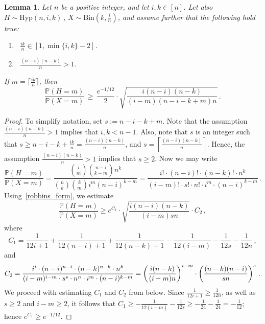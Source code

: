 \documentclass[10pt]{article}
\theoremstyle{plain}
\newtheorem{lemma}[theorem]{Lemma}
\theoremstyle{definition}
\theoremstyle{remark}
\newcommand{\Prb}{\mathbb{P}}
\begin{document}
\begin{lemma}\label{ratio_hyp_bin}
Let $n$ be a positive integer, and let $i,k\in [n]$. 
Let also $H\sim\text{Hyp}(n,i,k)$\,,  $X\sim\text{Bin}(k,\frac{i}{n})$, and 
assume further that the following hold true:
\begin{enumerate} 
\item \, $\frac{ik}{n}\in [1, \min\{i,k\}-2]$. 
\item \, $\frac{(n-i)(n-k)}{n}> 1$. 
\end{enumerate}
If $m=\lceil \frac{ik}{n}\rceil$, then  
\[
\frac{\Prb(H=m)}{\Prb(X=m)} \,\ge\, \frac{e^{-1/12}}{2} \cdot \sqrt{\frac{i(n-i)(n-k)}{(i-m)(n-i-k+m)n}} \, . 
\]
\end{lemma}
\begin{proof}
To simplify notation,  set $s:= n-i-k+m$. 
Note that the assumption $\frac{(n-i)(n-k)}{n}>  1$ implies that $i,k < n-1$. Also, 
note that $s$ is an integer such that 
$s \ge n-i-k+\frac{ik}{n} = \frac{(n-i)(n-k)}{n}$, 
and  $s = \left\lceil \frac{(n-i)(n-k)}{n} \right\rceil$.  
Hence, the assumption $\frac{(n-i)(n-k)}{n}> 1$ implies that $s\ge 2$. 
Now we may write  
\[
\frac{\Prb(H=m)}{\Prb(X=m)} = \frac{\binom{i}{m}\binom{n-i}{k-m} n^k}{\binom{n}{k}\binom{k}{m} i^m(n-i)^{k-m}} = 
\frac{i! \cdot (n-i)! \cdot (n-k)! \cdot n^k}{(i-m)!\cdot s! \cdot n! \cdot i^m \cdot (n-i)^{k-m}} \, .
\]
Using~\eqref{robbins_form}, we estimate 
\[
\frac{\Prb(H=m)}{\Prb(X=m)} \ge e^{C_1} \cdot \sqrt{\frac{i(n-i)(n-k)}{(i-m)s n}} \cdot C_2 \, ,
\]
where 
\[
C_1 = \frac{1}{12i+1} + \frac{1}{12(n-i)+1}+\frac{1}{12(n-k)+1} - \frac{1}{12(i-m)} - \frac{1}{12s}-\frac{1}{12n} \, ,
\]
and 
\[
C_2 = \frac{i^i\cdot (n-i)^{n-i}\cdot (n-k)^{n-k}\cdot  n^k}{(i-m)^{i-m}\cdot s^{s}\cdot n^n\cdot i^m\cdot (n-i)^{k-m}}\\
= \left(\frac{i(n-k)}{(i-m)n} \right)^{i-m} \cdot \left( \frac{(n-k)(n-i)}{s n}\right)^{s} \, . 
\]
We  proceed with estimating $C_1$ and $C_2$ from below. 
Since $\frac{1}{12i+1} \ge \frac{1}{12n}$, as well as  $s \ge 2$ and $i-m\ge 2$, it follows that  
$C_1\ge - \frac{1}{12(i-m)} - \frac{1}{12s}\ge -\frac{1}{24}-\frac{1}{24} = -\frac{1}{12}$; hence $e^{C_1} \ge e^{-1/12}$. 


\end{proof}
\end{document}
